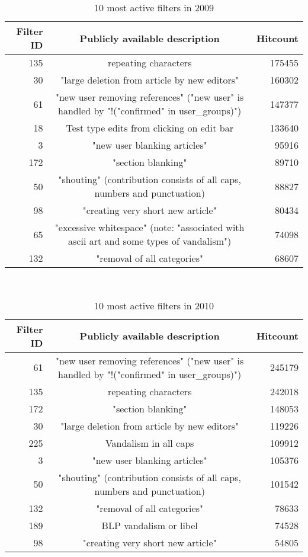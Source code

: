\begin{table}
  \centering
  \begin{tabular}{r c r }
    Filter ID & Publicly available description & Hitcount \\ %
    \hline
    135 & repeating characters & 175455 \\
    30 & "large deletion from article by new editors" & 160302 \\
    61 & "new user removing references" ("new user" is handled by "!("confirmed" in user\_groups)") & 147377 \\
    18 & Test type edits from clicking on edit bar & 133640 \\
    3 & "new user blanking articles" & 95916 \\
    172 & "section blanking" & 89710 \\
    50 & "shouting" (contribution consists of all caps, numbers and punctuation) & 88827 \\
    98 & "creating very short new article" & 80434 \\
    65 & "excessive whitespace" (note: "associated with ascii art and some types of vandalism") & 74098 \\
    132 & "removal of all categories" & 68607 \\
  \end{tabular}
  \caption{10 most active filters in 2009}~\label{tab:app-most-active-2009}
\end{table}

\begin{table}
  \centering
  \begin{tabular}{r c r }
    Filter ID & Publicly available description & Hitcount \\
    \hline
    61 & "new user removing references" ("new user" is handled by "!("confirmed" in user\_groups)") & 245179 \\
    135 & repeating characters & 242018 \\
    172 & "section blanking" & 148053 \\
    30 & "large deletion from article by new editors" & 119226 \\
    225 & Vandalism in all caps & 109912 \\
    3 & "new user blanking articles" & 105376 \\
    50 & "shouting" (contribution consists of all caps, numbers and punctuation) & 101542 \\
    132 & "removal of all categories" & 78633 \\
    189 & BLP vandalism or libel & 74528 \\
    98 & "creating very short new article" & 54805 \\
  \end{tabular}
  \caption{10 most active filters in 2010}~\label{tab:app-most-active-2010}
\end{table}


